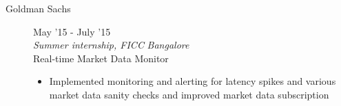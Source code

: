 \documentclass[9pt]{article}
\newenvironment{changemargin}[2]{%
  \begin{list}{}{%
      \setlength{\topsep}{0pt}%
    \setlength{\leftmargin}{#1}%
    \setlength{\rightmargin}{#2}%
    \setlength{\listparindent}{\parindent}%
  \setlength{\itemindent}{\parindent}%
    \setlength{\parsep}{\parskip}%
    }%
  \item[]}{\end{list}
    }
\newenvironment{body} {
  \vspace*{-16pt}
        \begin{changemargin}{-0.6in}{-0.65in}
        }	
        {\end{changemargin}
}
\begin{document}
\begin{body}
\begin{description}
    \item[Goldman Sachs] \hfill {May '15 - July '15} \\
      \textit{Summer internship, FICC}  \hfill \textit{Bangalore} \\
      \normalsize{Real-time Market Data Monitor}
      \begin{itemize}
        \item Implemented monitoring and alerting for latency spikes and various market data sanity checks and improved market data subscription
      \end{itemize}

  \end{description}

\end{body}
\end{document}
